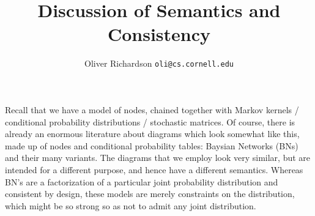 \documentclass{article}
\title{Discussion of \todo{need name for model} Semantics and Consistency}
\author{Oliver Richardson  \texttt{oli@cs.cornell.edu}}
\begin{document}
	\maketitle

%	
%	


%	


	Recall that we have a model of nodes, chained together with Markov kernels / conditional probability distributions / stochastic matrices. Of course, there is already an enormous literature about diagrams which look somewhat like this, made up of nodes and conditional probability tables: Baysian Networks (BNs) and their many variants. The diagrams that we employ look very similar, but are intended for a different purpose, and hence have a different semantics. Whereas BN's are a factorization of a particular joint probability distribution and consistent by design, these models are merely constraints on the distribution, which might be so strong so as not to admit any joint distribution.
	
\end{document}
